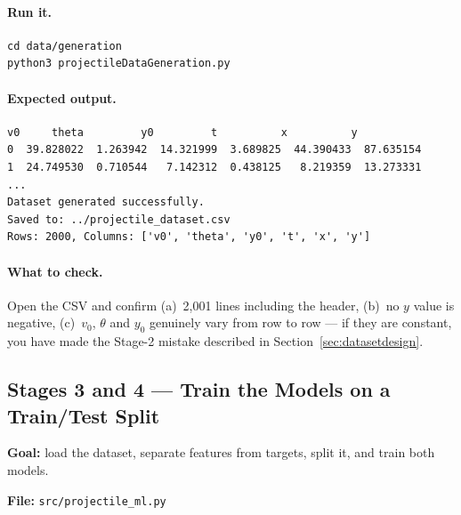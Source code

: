 \documentclass[11pt,a4paper]{article}
\newcommand{\vzero}{v_{0}}
\newcommand{\yzero}{y_{0}}
\begin{document}
\paragraph{Run it.}
\begin{lstlisting}[style=shellstyle,numbers=none]
cd data/generation
python3 projectileDataGeneration.py
\end{lstlisting}

\paragraph{Expected output.}
\begin{lstlisting}[style=shellstyle,numbers=none]
          v0     theta         y0         t          x          y
0  39.828022  1.263942  14.321999  3.689825  44.390433  87.635154
1  24.749530  0.710544   7.142312  0.438125   8.219359  13.273331
...
Dataset generated successfully.
Saved to: ../projectile_dataset.csv
Rows: 2000, Columns: ['v0', 'theta', 'y0', 't', 'x', 'y']
\end{lstlisting}

\paragraph{What to check.}
Open the CSV and confirm (a)~2{,}001 lines including the header, (b)~no $y$ value is negative,
(c)~$\vzero$, $\theta$ and $\yzero$ genuinely vary from row to row --- if they are constant, you
have made the Stage-2 mistake described in Section~\ref{sec:datasetdesign}.

\subsection*{Stages 3 and 4 --- Train the Models on a Train/Test Split}

\textbf{Goal:} load the dataset, separate features from targets, split it, and train both models.

\textbf{File:} \texttt{src/projectile\_ml.py}
\end{document}
